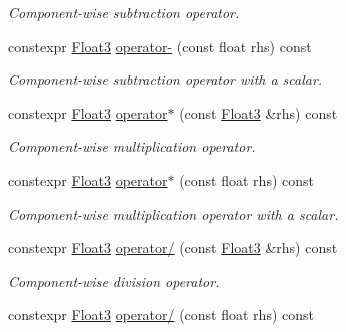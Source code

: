 \begin{DoxyCompactItemize}
\begin{DoxyCompactList}\small\item\em Component-\/wise subtraction operator. \end{DoxyCompactList}\item 
constexpr \hyperlink{structcpom_1_1_float3}{Float3} \hyperlink{structcpom_1_1_float3_ad330148418ff4237ef51171a6577ce75}{operator-\/} (const float rhs) const \hypertarget{structcpom_1_1_float3_ad330148418ff4237ef51171a6577ce75}{}\label{structcpom_1_1_float3_ad330148418ff4237ef51171a6577ce75}

\begin{DoxyCompactList}\small\item\em Component-\/wise subtraction operator with a scalar. \end{DoxyCompactList}\item 
constexpr \hyperlink{structcpom_1_1_float3}{Float3} \hyperlink{structcpom_1_1_float3_a095ed6ad7ffefe30b271c8f4972d4f49}{operator$\ast$} (const \hyperlink{structcpom_1_1_float3}{Float3} \&rhs) const \hypertarget{structcpom_1_1_float3_a095ed6ad7ffefe30b271c8f4972d4f49}{}\label{structcpom_1_1_float3_a095ed6ad7ffefe30b271c8f4972d4f49}

\begin{DoxyCompactList}\small\item\em Component-\/wise multiplication operator. \end{DoxyCompactList}\item 
constexpr \hyperlink{structcpom_1_1_float3}{Float3} \hyperlink{structcpom_1_1_float3_a77cfd5607a0b2c2150058c783ae868b3}{operator$\ast$} (const float rhs) const \hypertarget{structcpom_1_1_float3_a77cfd5607a0b2c2150058c783ae868b3}{}\label{structcpom_1_1_float3_a77cfd5607a0b2c2150058c783ae868b3}

\begin{DoxyCompactList}\small\item\em Component-\/wise multiplication operator with a scalar. \end{DoxyCompactList}\item 
constexpr \hyperlink{structcpom_1_1_float3}{Float3} \hyperlink{structcpom_1_1_float3_a8ac0f5a686d5a16fb4a081782434c8be}{operator/} (const \hyperlink{structcpom_1_1_float3}{Float3} \&rhs) const \hypertarget{structcpom_1_1_float3_a8ac0f5a686d5a16fb4a081782434c8be}{}\label{structcpom_1_1_float3_a8ac0f5a686d5a16fb4a081782434c8be}

\begin{DoxyCompactList}\small\item\em Component-\/wise division operator. \end{DoxyCompactList}\item 
constexpr \hyperlink{structcpom_1_1_float3}{Float3} \hyperlink{structcpom_1_1_float3_a1d45c35d64994c877c252991f7456ca3}{operator/} (const float rhs) const \hypertarget{structcpom_1_1_float3_a1d45c35d64994c877c252991f7456ca3}{}\label{structcpom_1_1_float3_a1d45c35d64994c877c252991f7456ca3}


\end{DoxyCompactItemize}
